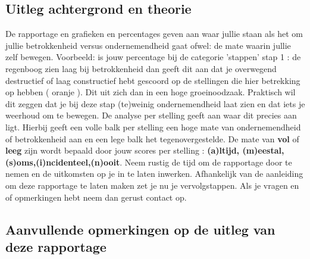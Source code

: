 \subsection{Uitleg achtergrond en theorie}
De rapportage en grafieken en percentages geven aan waar jullie staan als het om jullie betrokkenheid versus ondernemendheid gaat ofwel: de mate waarin jullie zelf bewegen. Voorbeeld: is jouw percentage bij de categorie 'stappen' stap 1 : de regenboog zien laag bij betrokkenheid dan geeft dit aan dat je overwegend destructief of laag constructief hebt gescoord op de stellingen die hier betrekking op hebben ( oranje ).
Dit uit zich dan in een hoge groeinoodzaak. Praktisch wil dit zeggen dat je bij deze stap (te)weinig ondernemendheid laat zien en dat iets je weerhoud om te bewegen. De analyse per stelling geeft aan waar dit precies aan ligt. Hierbij geeft een volle balk per stelling een hoge mate van ondernemendheid of betrokkenheid aan en een lege balk het tegenovergestelde. De mate van {\bf vol} of {\bf leeg} zijn wordt bepaald door jouw scores per stelling : {\bf (a)ltijd, (m)eestal,(s)oms,(i)ncidenteel,(n)ooit}.
Neem rustig de tijd om de rapportage door te nemen en de uitkomsten op je in te laten inwerken. Afhankelijk van de aanleiding om deze rapportage te laten maken zet je nu je vervolgstappen. Als je vragen en of opmerkingen hebt neem dan gerust contact op.
\color{blue}
\subsection*{Aanvullende opmerkingen op de uitleg van deze rapportage}
\color{black}